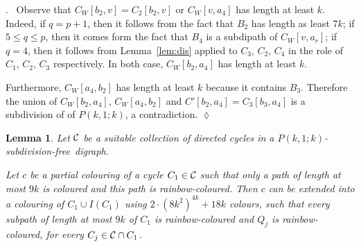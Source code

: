 \documentclass[utf8,11pt]{article}
\theoremstyle{plain}
\newtheorem{lemma}[theorem]{Lemma}
\theoremstyle{definition}
\theoremstyle{remark}
\newenvironment{subproof}{\par\noindent {\it Subproof}.\ }{\hfill$\lozenge$\par\vspace{11pt}}
\newcommand{\col}{(8k^2)^{4k}}
\newcommand{\free}{subdivision-free}
\begin{document}
\begin{subproof}
Observe that $C_W[b_2,v]=C_2[b_2,v]$ or $C_W[v, a_4]$ has length at least $k$.
Indeed, if $q=p+1$, then it follows from the fact that $B_2$ has length as least $7k$; if
$5\leq q\leq p$, then it comes form the fact that $B_4$ is a subdipath of $C_W[v, a_r]$; if $q=4$, then it follows from Lemma~\ref{lem:dis}  applied to $C_3$, $C_2$, $C_4$ in the role of $C_1$, $C_2$, $C_3$ respectively.
In both case, $C_W[b_2, a_4]$ has length at least $k$. 

Furthermore, $C_W[a_4,b_2]$ has length at least $k$ because it contains $B_3$. Therefore the union of
$C_W[b_2, a_4]$, $C_W[a_4,b_2]$ and $C'[b_2,a_4]=C_3[b_3,a_4]$ is a subdivision of of $P(k,1;k)$, a contradiction.
\end{subproof}




\begin{lemma}\label{lem:IC}
Let ${\cal C}$ be a suitable collection of directed cycles in a $P(k,1;k)$-\free\ digraph.

Let $c$ be a partial colouring of a cycle $C_1\in {\cal C}$ such that only a path of length at most
$9k$ is coloured and this path is rainbow-coloured. Then $c$ can be extended into
a colouring of $C_1\cup I(C_1)$ using $2\cdot \col + 18k$ colours, such that every subpath of length at most $9k$ of $C_1$ is rainbow-coloured and  $Q_j$ is rainbow-coloured, for every $C_j\in {\cal C}\cap C_1$.\end{lemma}
\end{document}
